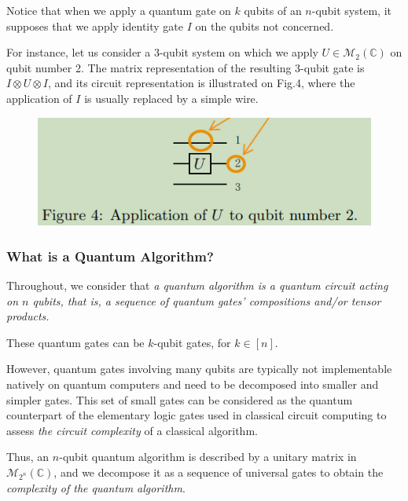 Notice that when we apply a quantum gate on $k$ qubits of an $n$-qubit system, it supposes that we apply identity gate $I$ on the qubits not concerned. 

\begin{example}
For instance, let us consider a 3-qubit system on which we apply $U \in \mathcal{M}_{2}(\mathbb{C})$ on qubit number 2. The matrix representation of the resulting 3-qubit gate is $I \otimes U \otimes I$, and its circuit representation is illustrated on Fig.4, where the application of $I$ is usually replaced by a simple wire.
\begin{figure}[ht]
    \centering
    \includegraphics[width=0.5\linewidth]{Images/grange2023-3.png}
\end{figure}
\end{example}

\subsubsection{What is a Quantum Algorithm?}

Throughout, we consider that \textit{a quantum algorithm is a quantum circuit acting on $n$ qubits, that is, a sequence of quantum gates' compositions and/or tensor products. } %

These quantum gates can be $k$-qubit gates, for $k \in[n]$. %

However, quantum gates involving many qubits are typically not implementable natively on quantum computers and need to be decomposed into smaller and simpler gates. This set of small gates can be considered as the quantum counterpart of the elementary logic gates used in classical circuit computing to assess \textit{the circuit complexity} of a classical algorithm. %

Thus, an $n$-qubit quantum algorithm is described by a unitary matrix in $\mathcal{M}_{2^{n}}(\mathbb{C})$, and we decompose it as a sequence of universal gates to obtain the \textit{complexity of the quantum algorithm}. %

